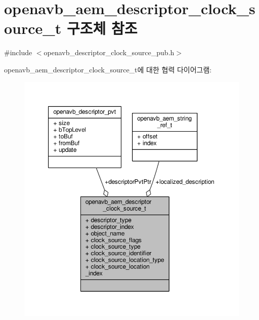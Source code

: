 \hypertarget{structopenavb__aem__descriptor__clock__source__t}{}\section{openavb\+\_\+aem\+\_\+descriptor\+\_\+clock\+\_\+source\+\_\+t 구조체 참조}
\label{structopenavb__aem__descriptor__clock__source__t}


{\ttfamily \#include $<$openavb\+\_\+descriptor\+\_\+clock\+\_\+source\+\_\+pub.\+h$>$}



openavb\+\_\+aem\+\_\+descriptor\+\_\+clock\+\_\+source\+\_\+t에 대한 협력 다이어그램\+:
\nopagebreak
\begin{figure}[H]
\begin{center}
\leavevmode
\includegraphics[width=350pt]{structopenavb__aem__descriptor__clock__source__t__coll__graph}
\end{center}
\end{figure}
